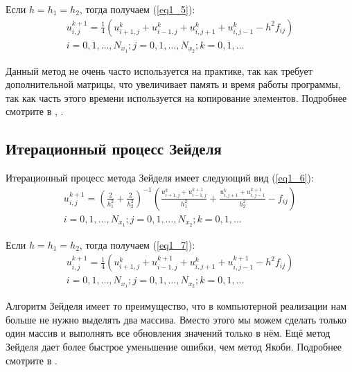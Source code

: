 \documentclass[a4paper, 14pt]{extreport}
\begin{document}
	Если $h=h_1=h_2$, тогда получаем (\ref{eq1_5}): 
	\begin{equation}\label{eq1_5}
		\begin{split}
			u^{k+1}_{i,j} = \frac{1}{4}
				\left(u_{i+1,j}^k+u_{i-1,j}^k+u_{i,j+1}^k+u_{i,j-1}^k - h^2f_{ij}\right)\\
			i=0,1,\dots,N_{x_1}; j=0,1,\dots,N_{x_2}; k=0,1,\dots
		\end{split}
	\end{equation}
	
	Данный метод не очень часто используется на практике, так как требует дополнительной матрицы, что увеличивает память и время работы программы, так как часть этого времени используется на копирование элементов.
	Подробнее смотрите в \citealp{falechik}, \citealp{estproceses}.
	
	\subsection{Итерационный процесс  Зейделя}
	Итерационный процесс метода Зейделя имеет следующий вид (\ref{eq1_6}):
	\begin{equation}\label{eq1_6}
		\begin{split}
			u^{k+1}_{i,j} = 
				\left(\frac{2}{h_1^2}+\frac{2}{h_2^2}\right)^{-1} 
				\left(\frac{u_{i+1,j}^k+u_{i-1,j}^{k+1}}{h_1^2} + \frac{u_{i,j+1}^k+u_{i,j-1}^{k+1}}{h_2^2} - f_{ij}\right)\\
			i=0,1,\dots,N_{x_1}; j=0,1,\dots,N_{x_2}; k=0,1,\dots
		\end{split}
	\end{equation}
	
	Если $h=h_1=h_2$, тогда получаем (\ref{eq1_7}):
	\begin{equation}\label{eq1_7}
		\begin{split}
			u^{k+1}_{i,j} = \frac{1}{4}
				\left(u_{i+1,j}^k+u_{i-1,j}^{k+1}+u_{i,j+1}^k+u_{i,j-1}^{k+1} - h^2f_{ij}\right)\\
			i=0,1,\dots,N_{x_1}; j=0,1,\dots,N_{x_2}; k=0,1,\dots
		\end{split}
	\end{equation}
	
	Алгоритм Зейделя имеет то преимущество, что в компьютерной реализации нам больше не нужно выделять два массива. Вместо этого мы можем сделать только один массив и выполнять все обновления значений только в нём. Ещё метод Зейделя дает более быстрое уменьшение ошибки, чем метод Якоби.
	Подробнее смотрите в \citealp{eukm}.
	
\end{document}
